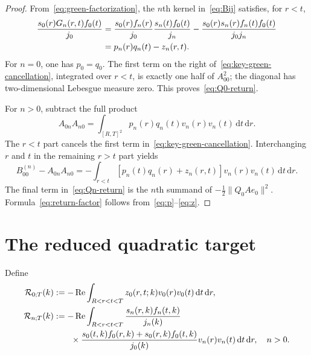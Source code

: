 \documentclass[11pt]{article}
\newcommand{\dd}{\,\mathrm d}
\newcommand{\cR}{\mathcal R}
\DeclareMathOperator{\Rea}{Re}
\theoremstyle{definition}
\begin{document}
\begin{proof}
From~\eqref{eq:green-factorization}, the $n$th kernel in~\eqref{eq:Bij} satisfies, for $r<t$,
\begin{align}
 \frac{s_0(r)G_n(r,t)f_0(t)}{j_0}
 &=\frac{s_0(r)f_n(r)}{j_0}
   \frac{s_n(t)f_0(t)}{j_n}
 -\frac{s_0(r)s_n(r)f_n(t)f_0(t)}{j_0j_n}\notag\\
 &=p_n(r)q_n(t)-z_n(r,t).
 \label{eq:key-green-cancellation}
\end{align}
For $n=0$, one has $p_0=q_0$.  The first term on the right of~\eqref{eq:key-green-cancellation}, integrated over $r<t$, is exactly one half of $A_{00}^2$; the diagonal has two-dimensional Lebesgue measure zero.  This proves~\eqref{eq:Q0-return}.

For $n>0$, subtract the full product
\begin{equation}
 A_{0n}A_{n0}=\int_{[R,T]^2}p_n(r)q_n(t)v_n(r)v_n(t)\dd t\dd r.
\end{equation}
The $r<t$ part cancels the first term in~\eqref{eq:key-green-cancellation}.  Interchanging $r$ and $t$ in the remaining $r>t$ part yields
\begin{equation}
 B_{00}^{(n)}-A_{0n}A_{n0}
 =-\int_{r<t}[p_n(t)q_n(r)+z_n(r,t)]v_n(r)v_n(t)\dd t\dd r.
\end{equation}
The final term in~\eqref{eq:Qn-return} is the $n$th summand of $-\frac12\|Q_0Ae_0\|^2$.  Formula~\eqref{eq:return-factor} follows from~\eqref{eq:p}--\eqref{eq:z}.
\end{proof}

\section{The reduced quadratic target}

Define
\begin{align}
 \cR_{0;T}(k)
 &:=-\Rea\int_{R<r<t<T}z_0(r,t;k)v_0(r)v_0(t)\dd t\dd r,
 \label{eq:R0}\\
 \cR_{n;T}(k)
 &:=-\Rea\int_{R<r<t<T}
 \frac{s_n(r,k)f_n(t,k)}{j_n(k)}\notag\\
 &\qquad\times
 \frac{s_0(t,k)f_0(r,k)+s_0(r,k)f_0(t,k)}{j_0(k)}
 v_n(r)v_n(t)\dd t\dd r,
 \quad n>0.
 \label{eq:Rn}
\end{align}
\end{document}
